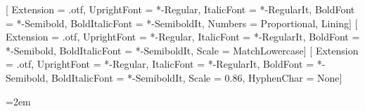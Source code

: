 %
%
%


\usepackage{etoolbox}
\usepackage{fontspec}
\usepackage[shorthands=off,british,lithuanian]{babel}
\usepackage{microtype}
\usepackage[colon=literal]{unicode-math}

\setmainfont{SourceSerif4}[
  Extension      = .otf,
  UprightFont    = *-Regular,
  ItalicFont     = *-RegularIt,
  BoldFont       = *-Semibold,
  BoldItalicFont = *-SemiboldIt,
  Numbers        = {Proportional, Lining}]
\setsansfont{SourceSans3}[
  Extension      = .otf,
  UprightFont    = *-Regular,
  ItalicFont     = *-RegularIt,
  BoldFont       = *-Semibold,
  BoldItalicFont = *-SemiboldIt,
  Scale          = MatchLowercase]
\setmonofont{SourceCodePro}[
  Extension      = .otf,
  UprightFont    = *-Regular,
  ItalicFont     = *-RegularIt,
  BoldFont       = *-Semibold,
  BoldItalicFont = *-SemiboldIt,
  Scale          = 0.86,
  HyphenChar     = None]

\usepackage[a4paper, left=30mm, right=30mm, top=27mm, bottom=30mm,
            headheight=14pt, headsep=9mm, footskip=12mm]{geometry}
\usepackage{setspace}
\raggedbottom
\emergencystretch=2em


